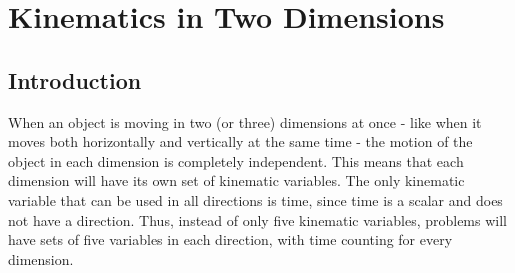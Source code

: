 \chapter{Kinematics in Two Dimensions}
	\section{Introduction}
	
	When an object is moving in two (or three) dimensions at once - like when it moves both horizontally and vertically at the same time - the motion of the object in each dimension is completely independent.  This means that each dimension will have its own set of kinematic variables.  The only kinematic variable that can be used in all directions is time, since time is a scalar and does not have a direction.  Thus, instead of only five kinematic variables, problems will have sets of five variables in each direction, with time counting for every dimension.  
	
